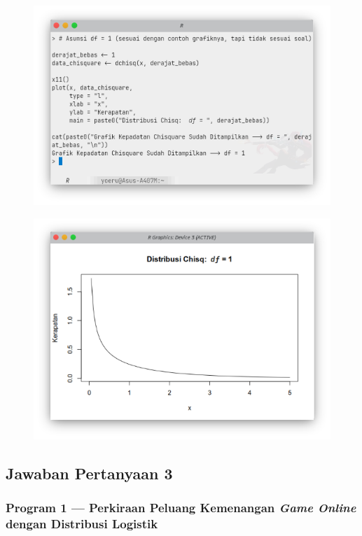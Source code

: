 \begin{figure}[H]
    \centering
    \includegraphics[width=.8\linewidth]{image/Kepadatan Chisquare df1.png}
    \vspace{-\baselineskip}
\end{figure}

\begin{figure}[H]
    \centering
    \includegraphics[width=.8\linewidth]{image/Grafik Kepadatan Chisquare Berderajat Bebas 1.png}
    \vspace{-\baselineskip}
\end{figure}

\subsection{Jawaban Pertanyaan 3}

\subsubsection{Program 1 --- Perkiraan Peluang Kemenangan \textit{Game Online} dengan Distribusi Logistik}

